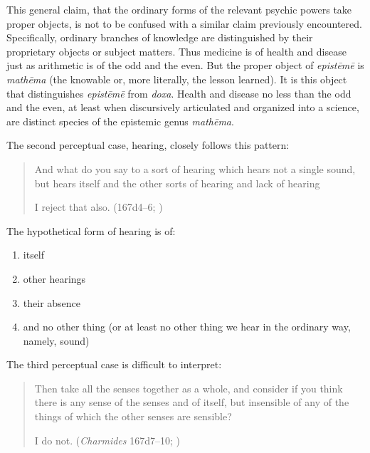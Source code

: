 This general claim, that the ordinary forms of the relevant psychic powers take proper objects, is not to be confused with a similar claim previously encountered. Specifically, ordinary branches of knowledge are distinguished by their proprietary objects or subject matters. Thus medicine is of health and disease just as arithmetic is of the odd and the even. But the proper object of \emph{epistēmē} is \emph{mathēma} (the knowable or, more literally, the lesson learned). It is this object that distinguishes \emph{epistēmē} from \emph{doxa}. Health and disease no less than the odd and the even, at least when discursively articulated and organized into a science, are distinct species of the epistemic genus \emph{mathēma}.

The second perceptual case, hearing, closely follows this pattern:
\begin{quotation}
	And what do you say to a sort of hearing which hears not a single sound, but hears itself and the other sorts of hearing and lack of hearing
	
	I reject that also. (167d4–6; \citealt[59]{Lamb:1927qw})
\end{quotation}
The hypothetical form of hearing is of:
\begin{enumerate}[(1)]
	\item itself
	\item other hearings
	\item their absence
	\item and no other thing (or at least no other thing we hear in the ordinary way, namely, sound)
\end{enumerate}

The third perceptual case is difficult to interpret:
\begin{quotation}
	Then take all the senses together as a whole, and consider if you think there is any sense of the senses and of itself, but insensible of any of the things of which the other senses are sensible?
	
	I do not. (\emph{Charmides} 167d7–10; \citealt[59]{Lamb:1927qw})
\end{quotation}

